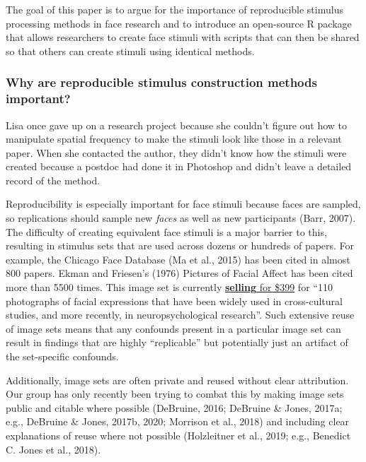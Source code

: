 \documentclass[
  doc,floatsintext]{apa6}
\begin{document}
The goal of this paper is to argue for the importance of reproducible stimulus processing methods in face research and to introduce an open-source R package that allows researchers to create face stimuli with scripts that can then be shared so that others can create stimuli using identical methods.

\hypertarget{why-are-reproducible-stimulus-construction-methods-important}{%
\subsubsection{Why are reproducible stimulus construction methods important?}\label{why-are-reproducible-stimulus-construction-methods-important}}

Lisa once gave up on a research project because she couldn't figure out how to manipulate spatial frequency to make the stimuli look like those in a relevant paper. When she contacted the author, they didn't know how the stimuli were created because a postdoc had done it in Photoshop and didn't leave a detailed record of the method.

Reproducibility is especially important for face stimuli because faces are sampled, so replications should sample new \emph{faces} as well as new participants (Barr, 2007). The difficulty of creating equivalent face stimuli is a major barrier to this, resulting in stimulus sets that are used across dozens or hundreds of papers. For example, the Chicago Face Database (Ma et al., 2015) has been cited in almost 800 papers. Ekman and Friesen's (1976) Pictures of Facial Affect has been cited more than 5500 times. This image set is currently \href{https://www.paulekman.com/product/pictures-of-facial-affect-pofa/}{\textbf{selling} for \$399} for ``110 photographs of facial expressions that have been widely used in cross-cultural studies, and more recently, in neuropsychological research''. Such extensive reuse of image sets means that any confounds present in a particular image set can result in findings that are highly ``replicable'' but potentially just an artifact of the set-specific confounds.

Additionally, image sets are often private and reused without clear attribution. Our group has only recently been trying to combat this by making image sets public and citable where possible (DeBruine, 2016; DeBruine \& Jones, 2017a; e.g., DeBruine \& Jones, 2017b, 2020; Morrison et al., 2018) and including clear explanations of reuse where not possible (Holzleitner et al., 2019; e.g., Benedict C. Jones et al., 2018).
\end{document}
